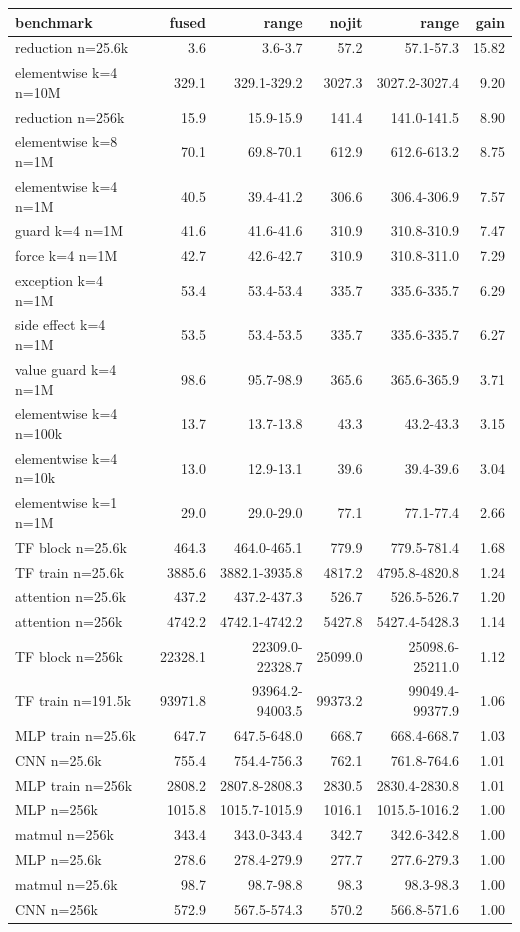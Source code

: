 \begin{tabular}{lrrrrr}
\toprule
benchmark & fused & range & nojit & range & gain \\
\midrule
reduction n=25.6k & 3.6 & 3.6-3.7 & 57.2 & 57.1-57.3 & 15.82 \\
elementwise k=4 n=10M & 329.1 & 329.1-329.2 & 3027.3 & 3027.2-3027.4 & 9.20 \\
reduction n=256k & 15.9 & 15.9-15.9 & 141.4 & 141.0-141.5 & 8.90 \\
elementwise k=8 n=1M & 70.1 & 69.8-70.1 & 612.9 & 612.6-613.2 & 8.75 \\
elementwise k=4 n=1M & 40.5 & 39.4-41.2 & 306.6 & 306.4-306.9 & 7.57 \\
guard k=4 n=1M & 41.6 & 41.6-41.6 & 310.9 & 310.8-310.9 & 7.47 \\
force k=4 n=1M & 42.7 & 42.6-42.7 & 310.9 & 310.8-311.0 & 7.29 \\
exception k=4 n=1M & 53.4 & 53.4-53.4 & 335.7 & 335.6-335.7 & 6.29 \\
side effect k=4 n=1M & 53.5 & 53.4-53.5 & 335.7 & 335.6-335.7 & 6.27 \\
value guard k=4 n=1M & 98.6 & 95.7-98.9 & 365.6 & 365.6-365.9 & 3.71 \\
elementwise k=4 n=100k & 13.7 & 13.7-13.8 & 43.3 & 43.2-43.3 & 3.15 \\
elementwise k=4 n=10k & 13.0 & 12.9-13.1 & 39.6 & 39.4-39.6 & 3.04 \\
elementwise k=1 n=1M & 29.0 & 29.0-29.0 & 77.1 & 77.1-77.4 & 2.66 \\
TF block n=25.6k & 464.3 & 464.0-465.1 & 779.9 & 779.5-781.4 & 1.68 \\
TF train n=25.6k & 3885.6 & 3882.1-3935.8 & 4817.2 & 4795.8-4820.8 & 1.24 \\
attention n=25.6k & 437.2 & 437.2-437.3 & 526.7 & 526.5-526.7 & 1.20 \\
attention n=256k & 4742.2 & 4742.1-4742.2 & 5427.8 & 5427.4-5428.3 & 1.14 \\
TF block n=256k & 22328.1 & 22309.0-22328.7 & 25099.0 & 25098.6-25211.0 & 1.12 \\
TF train n=191.5k & 93971.8 & 93964.2-94003.5 & 99373.2 & 99049.4-99377.9 & 1.06 \\
MLP train n=25.6k & 647.7 & 647.5-648.0 & 668.7 & 668.4-668.7 & 1.03 \\
CNN n=25.6k & 755.4 & 754.4-756.3 & 762.1 & 761.8-764.6 & 1.01 \\
MLP train n=256k & 2808.2 & 2807.8-2808.3 & 2830.5 & 2830.4-2830.8 & 1.01 \\
MLP n=256k & 1015.8 & 1015.7-1015.9 & 1016.1 & 1015.5-1016.2 & 1.00 \\
matmul n=256k & 343.4 & 343.0-343.4 & 342.7 & 342.6-342.8 & 1.00 \\
MLP n=25.6k & 278.6 & 278.4-279.9 & 277.7 & 277.6-279.3 & 1.00 \\
matmul n=25.6k & 98.7 & 98.7-98.8 & 98.3 & 98.3-98.3 & 1.00 \\
CNN n=256k & 572.9 & 567.5-574.3 & 570.2 & 566.8-571.6 & 1.00 \\
\bottomrule
\end{tabular}
